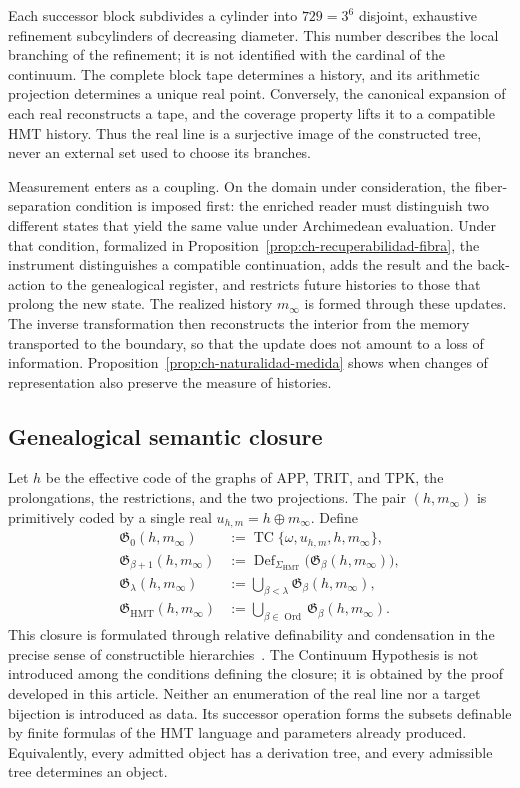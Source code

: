 Each successor block subdivides a cylinder into \(729=3^6\) disjoint,
exhaustive refinement subcylinders of decreasing diameter. This number
describes the local branching of the refinement; it is not identified with
the cardinal of the continuum. The complete block tape determines a history,
and its arithmetic projection determines a unique real point. Conversely, the
canonical expansion of each real reconstructs a tape, and the coverage
property lifts it to a compatible HMT history. Thus the real line is a
surjective image of the constructed tree, never an external set used to
choose its branches.

Measurement enters as a coupling. On the domain under consideration, the
fiber-separation condition is imposed first: the enriched reader must
distinguish two different states that yield the same value under Archimedean evaluation. Under that
condition, formalized in Proposition~\ref{prop:ch-recuperabilidad-fibra}, the
instrument distinguishes a compatible continuation, adds the result and the
back-action to the genealogical register, and restricts future histories to
those that prolong the new state. The realized history \(m_\infty\) is formed
through these updates. The inverse transformation then reconstructs the
interior from the memory transported to the boundary, so that the update does
not amount to a loss of information. Proposition~\ref{prop:ch-naturalidad-medida}
shows when changes of representation also preserve the measure of histories.

\subsection{Genealogical semantic closure}

Let \(h\) be the effective code of the graphs of APP, TRIT, and TPK, the
prolongations, the restrictions, and the two projections. The pair
\((h,m_\infty)\) is primitively coded by a single real
\(u_{h,m}=h\oplus m_\infty\). Define
\[
 \begin{aligned}
 \mathfrak G_0(h,m_\infty)
   &:=\operatorname{TC}\{\omega,u_{h,m},h,m_\infty\},\\
 \mathfrak G_{\beta+1}(h,m_\infty)
   &:=\operatorname{Def}_{\Sigma_{\mathrm{HMT}}}
        \bigl(\mathfrak G_\beta(h,m_\infty)\bigr),\\
 \mathfrak G_\lambda(h,m_\infty)
   &:=\bigcup_{\beta<\lambda}\mathfrak G_\beta(h,m_\infty),\\
 \mathfrak G_{\mathrm{HMT}}(h,m_\infty)
   &:=\bigcup_{\beta\in\operatorname{Ord}}
        \mathfrak G_\beta(h,m_\infty).
 \end{aligned}
\]
This closure is formulated through relative definability and condensation in
the precise sense of constructible hierarchies~\cite{Jech2003}. The Continuum
Hypothesis is not introduced among the conditions defining the closure; it is
obtained by the proof developed in this article. Neither an enumeration of the
real line nor a target bijection is introduced as data. Its successor operation
forms the subsets definable by finite formulas of the HMT language and
parameters already produced. Equivalently, every admitted object has a
derivation tree, and every admissible tree determines an object.

